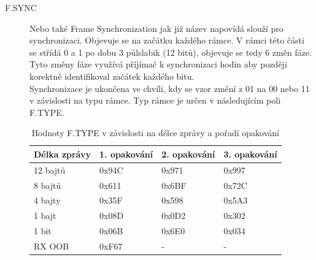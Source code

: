 \documentclass{ctuthesis}
\begin{document}
\begin{description}
\item[F.SYNC]
Nebo také Frame Synchronization jak již název napovídá slouží pro synchronizaci. Objevuje se na začátku každého rámce. V rámci této části se střídá 0 a 1 po dobu 3 půlslabik (12 bitů), objevuje se tedy 6 změn fáze. Tyto změny fáze využívá příjímač k synchronizaci hodin aby později korektně identifikoval začátek každého bitu.\\
Synchronizace je ukončena ve chvíli, kdy se vzor změní z 01 na 00 nebo 11 v závislosti na typu rámce. Typ rámce je určen v následujícím poli F.TYPE.

\begin{table}[]
\begin{tabular}{@{}llll@{}}
\toprule
Délka zprávy & 1. opakování & 2. opakování & 3. opakování \\ \midrule
12 bajtů     & 0x94C        & 0x971        & 0x997        \\
8 bajtů      & 0x611        & 0x6BF        & 0x72C        \\
4 bajty      & 0x35F        & 0x598        & 0x5A3        \\
1 bajt       & 0x08D        & 0x0D2        & 0x302        \\
1 bit        & 0x06B        & 0x6E0        & 0x034        \\
RX OOB       & 0xF67        & -            & -            \\ \bottomrule
\end{tabular}
\caption{Hodnoty F.TYPE v závislosti na délce zprávy a pořadí opakování \cite{sigfoxprotocol}}
\label{tab:ftype}
\end{table}


\end{description}
\end{document}
